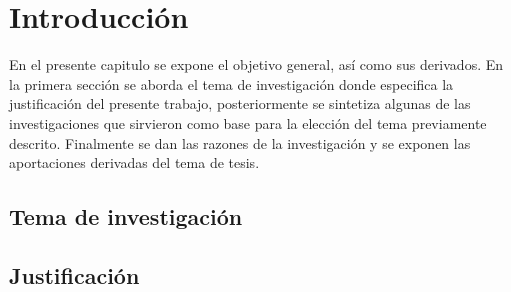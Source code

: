 

\chapter{Introducción}


En el presente capitulo se expone el objetivo general, así como sus derivados. En la primera sección se aborda el tema de investigación donde especifica la justificación del presente trabajo, posteriormente se sintetiza algunas de las investigaciones que sirvieron como base para la elección del tema previamente descrito. Finalmente se dan las razones de la investigación y se exponen las aportaciones derivadas del tema de tesis.

\section{Tema de investigación}

\section{Justificación}

